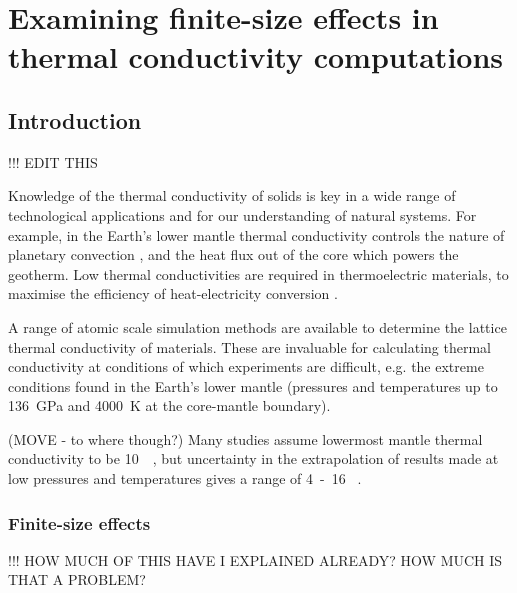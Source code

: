 
\chapter{Examining finite-size effects in thermal conductivity computations} %

\label{Chapter3} %

\section{\label{sec:3.intro}Introduction}

!!! EDIT THIS

Knowledge of the thermal conductivity of solids is key in a wide range of technological applications and for our understanding of natural systems. For example, in the Earth's lower mantle thermal conductivity controls the nature of planetary convection \citep{Tosi2013}, and the heat flux out of the core which powers the geotherm. Low thermal conductivities are required in thermoelectric materials, to maximise the efficiency of heat-electricity conversion \citep{Snyder2008}.

A range of atomic scale simulation methods are available to determine the lattice thermal conductivity of materials. These are invaluable for calculating thermal conductivity at conditions of which experiments are difficult, e.g. the extreme conditions found in the Earth's lower mantle (pressures and temperatures up to 136~GPa and 4000~K at the core-mantle boundary).

(MOVE - to where though?) Many studies assume lowermost mantle thermal conductivity to be 10~\wmk~\citep[e.g.][]{Lay2008}, but uncertainty in the extrapolation of results made at low pressures and temperatures gives a range of 4~-~16 \wmk~\citep{Brown1986, Osako1991, Hofmeister1999, Goncharov2009, Manthilake2011, Ohta2012}.

\subsection{\label{sec:3.FSE}Finite-size effects}

!!! HOW MUCH OF THIS HAVE I EXPLAINED ALREADY? HOW MUCH IS THAT A PROBLEM?

